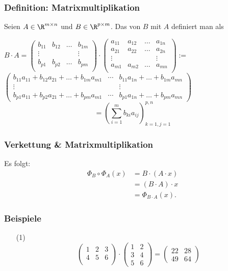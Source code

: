 \begin{frame}\frametitle{Definition: Matrixmultiplikation}
Seien $A\in \R^{m\times n}$ und $B \in \R^{p\times m}$. Das  von $B$ mit $A$ definiert man als

$B\cdot A = \begin{pmatrix}
			b_{11}	&b_{12}	&\ldots	&b_{1m}	\\
			\vdots	&		&		&\vdots	\\
			b_{p1}	&b_{p2}	&\ldots	&b_{pm}	\\
		\end{pmatrix}
		\cdot
		\begin{pmatrix}
			a_{11}	&a_{12}	&\ldots	&a_{1n}	\\
			a_{21}	&a_{22}	&\ldots	&a_{2n}	\\
			\vdots	&		&		&\vdots	\\
			a_{m1}	&a_{m2}	&\ldots	&a_{mn}	\\
		\end{pmatrix}	
		:=	
	$ \pause $	
		\begin{pmatrix}
			b_{11}a_{11} + b_{12}a_{21} + \ldots + b_{1m}a_{m1} & \cdots & b_{11}a_{1n}  + \ldots + b_{1m}a_{mn}\\
			\vdots &           & \vdots \\
			b_{p1}a_{11} + b_{p2}a_{21} + \ldots + b_{pm}a_{m1} & \cdots & b_{p1}a_{1n}  + \ldots + b_{pm}a_{mn}
		\end{pmatrix} 
	$
	$$
		= \left(\sum_{i=1}^m b_{ki}a_{ij}\right)_{k=1, j=1}^{p, n}
	$$

\end{frame}
%
%
\begin{frame}\frametitle{Verkettung \& Matrixmultiplikation}
	
	Es folgt:
	\begin{align*}
		\Phi_B\circ\Phi_A(x) 
			&= B\cdot (A\cdot x)	\\
			&= (B\cdot A)\cdot x	\\
			&= \Phi_{B\cdot A}(x).
	\end{align*}
	
\end{frame}
%
%
\begin{frame}\frametitle{Beispiele}

	\begin{itemize}
		\item[(1)]
			$$
				\begin{pmatrix}
					1			&2			&3	\\
					{4}	&{5}	&{6}	\\		
				\end{pmatrix}
				\cdot
				\begin{pmatrix}
					1	&{2}	\\
					3	&{4}	\\
					5	&{6}	
				\end{pmatrix}
				=
				\begin{pmatrix}
					22	&28	\\
					49	&{64}
				\end{pmatrix}
			$$


	
	\end{itemize}
\end{frame}
